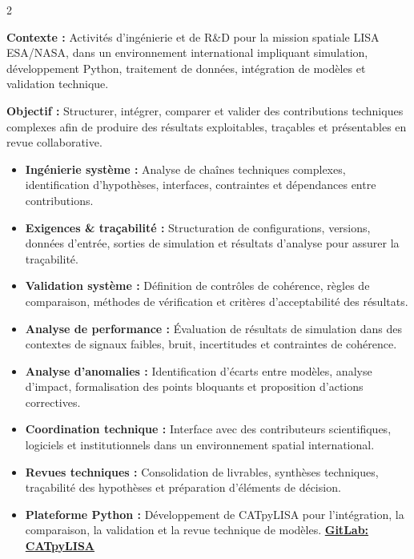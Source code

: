 \documentclass[8pt,a4paper,ragged2e,withhyper]{altacv}
\begin{document}
\begin{paracol}{2}
\divider


\textbf{Contexte :} Activités d’ingénierie et de R\&D pour la mission spatiale LISA ESA/NASA, dans un environnement international impliquant simulation, développement Python, traitement de données, intégration de modèles et validation technique.

\textbf{Objectif :} Structurer, intégrer, comparer et valider des contributions techniques complexes afin de produire des résultats exploitables, traçables et présentables en revue collaborative.

\begin{itemize}
  \item \textbf{Ingénierie système :} Analyse de chaînes techniques complexes, identification d’hypothèses, interfaces, contraintes et dépendances entre contributions.
  \item \textbf{Exigences \& traçabilité :} Structuration de configurations, versions, données d’entrée, sorties de simulation et résultats d’analyse pour assurer la traçabilité.
  \item \textbf{Validation système :} Définition de contrôles de cohérence, règles de comparaison, méthodes de vérification et critères d’acceptabilité des résultats.
  \item \textbf{Analyse de performance :} Évaluation de résultats de simulation dans des contextes de signaux faibles, bruit, incertitudes et contraintes de cohérence.
  \item \textbf{Analyse d’anomalies :} Identification d’écarts entre modèles, analyse d’impact, formalisation des points bloquants et proposition d’actions correctives.
  \item \textbf{Coordination technique :} Interface avec des contributeurs scientifiques, logiciels et institutionnels dans un environnement spatial international.
  \item \textbf{Revues techniques :} Consolidation de livrables, synthèses techniques, traçabilité des hypothèses et préparation d’éléments de décision.
  \item \textbf{Plateforme Python :} Développement de CATpyLISA pour l’intégration, la comparaison, la validation et la revue technique de modèles.
  \textcolor{DarkPastelRed}{\href{https://gitlab.oca.eu/gboileau/lisa_l3_tools}{\bf GitLab: CATpyLISA}}
\end{itemize}


\end{paracol}
\end{document}
